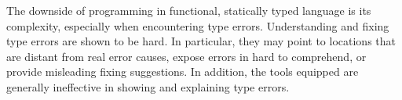The downside of programming in functional, statically typed language is its complexity, especially when encountering type errors. Understanding and fixing type errors are shown to be hard\cite{tirronen_understanding_2015}. In particular, they may point to locations that are distant from real error causes, expose errors in hard to comprehend, or provide misleading fixing suggestions. In addition, the tools equipped are generally ineffective in showing and explaining type errors\cite{wu_how_2017}.


